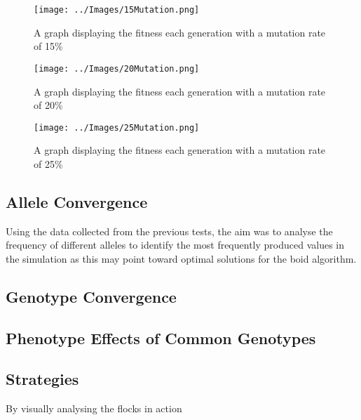 \begin{figure}[H]
	\texttt{[image: ../Images/15Mutation.png]}
	\caption{A graph displaying the fitness each generation with a mutation rate of 15\%}
	\label{fig:15mutation}
\end{figure}

\begin{figure}[H]
	\texttt{[image: ../Images/20Mutation.png]}
	\caption{A graph displaying the fitness each generation with a mutation rate of 20\%}
	\label{fig:20mutation}
\end{figure}

\begin{figure}[H]
	\texttt{[image: ../Images/25Mutation.png]}
	\caption{A graph displaying the fitness each generation with a mutation rate of 25\%}
	\label{fig:25mutation}
\end{figure}



\subsection{Allele Convergence}
Using the data collected from the previous tests, the aim was to analyse the frequency of different alleles to identify the most frequently produced values in the simulation as this may point toward optimal solutions for the boid algorithm. 

\subsection{Genotype Convergence}

\subsection{Phenotype Effects of Common Genotypes}


\subsection{Strategies}
By visually analysing the flocks in action 






















